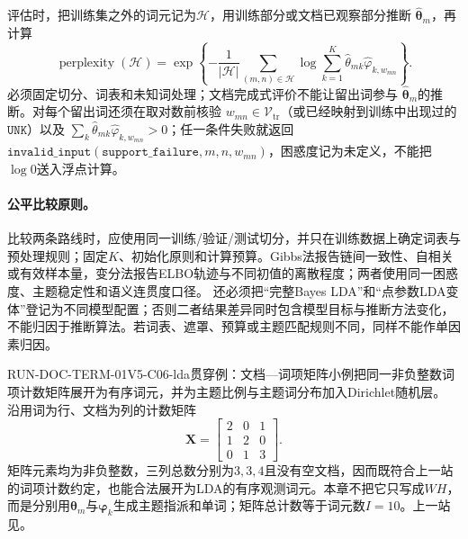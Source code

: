 评估时，把训练集之外的词元记为$\mathcal H$，用训练部分或文档已观察部分推断
$\widehat{\boldsymbol\theta}_m$，再计算
\begin{equation}
\operatorname{perplexity}(\mathcal H)
=\exp\!\left\{-\frac{1}{|\mathcal H|}
\sum_{(m,n)\in\mathcal H}
\log\sum_{k=1}^{K}\widehat\theta_{mk}\widehat\varphi_{k,w_{mn}}
\right\}.
\label{eq:V5-C06-perplexity}
\end{equation}
必须固定切分、词表和未知词处理；文档完成式评价不能让留出词参与
$\widehat{\boldsymbol\theta}_m$的推断。对每个留出词还须在取对数前核验
$w_{mn}\in\mathcal V_{\mathrm{tr}}$（或已经映射到训练中出现过的$\mathtt{UNK}$）以及
$\sum_k\widehat\theta_{mk}\widehat\varphi_{k,w_{mn}}>0$；任一条件失败就返回
$\mathtt{invalid\_input}(\mathtt{support\_failure},m,n,w_{mn})$，困惑度记为未定义，不能把$\log0$送入浮点计算。

\paragraph{公平比较原则。}
比较两条路线时，应使用同一训练/验证/测试切分，并只在训练数据上确定词表与预处理规则；固定$K$、初始化原则和计算预算。Gibbs法报告链间一致性、自相关或有效样本量，变分法报告ELBO轨迹与不同初值的离散程度；两者使用同一困惑度、主题稳定性和语义连贯度口径。
还必须把“完整Bayes LDA”和“点参数LDA变体”登记为不同模型配置；否则二者结果差异同时包含模型目标与推断方法变化，不能归因于推断算法。若词表、遮罩、预算或主题匹配规则不同，同样不能作单因素归因。


\begin{SLRunningExample}{RUN-DOC-TERM-01}{V5-C06-lda}{贯穿例：文档—词项矩阵小例}{把同一非负整数词项计数矩阵展开为有序词元，并为主题比例与主题词分布加入Dirichlet随机层。}
沿用词为行、文档为列的计数矩阵
\[
\boldsymbol X=\begin{bmatrix}2&0&1\\1&2&0\\0&1&3\end{bmatrix}.
\]
矩阵元素均为非负整数，三列总数分别为$3,3,4$且没有空文档，因而既符合上一站的词项计数约定，也能合法展开为LDA的有序观测词元。本章不把它只写成$WH$，而是分别用$\boldsymbol\theta_m$与$\boldsymbol\varphi_k$生成主题指派和单词；矩阵总计数等于词元数$I=10$。上一站见。
\end{SLRunningExample}

